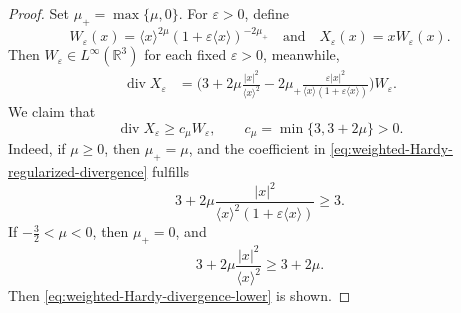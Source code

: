 \documentclass[11pt,twoside]{article}
\theoremstyle{plain}
\theoremstyle{definition}
\theoremstyle{assumption}
\numberwithin{equation}{section}
\begin{document}
	\begin{proof}
		Set
		$
		\mu_+=\max\{\mu,0\}.
		$
		For \(\varepsilon>0\), define
		\begin{equation*}
			W_\varepsilon(x)
			=
			\langle x\rangle^{2\mu}
			\left(
			1+\varepsilon\langle x\rangle
			\right)^{-2\mu_+}
		\quad\text{and} \quad
		X_\varepsilon(x)
			=xW_\varepsilon(x).
		\end{equation*}
		Then \(W_\varepsilon\in L^\infty(\mathbb R^3)\) for each fixed
		\(\varepsilon>0\), meanwhile,
		\begin{equation}
			\label{eq:weighted-Hardy-regularized-divergence}
			\begin{aligned}
				\operatorname{div}X_\varepsilon
				&=\big(3+2\mu\frac{|x|^2}{\langle x\rangle^2}
				-2\mu_+\frac{\varepsilon |x|^2}
				{\langle x\rangle(1+\varepsilon\langle x\rangle)}
				\big)W_\varepsilon.
			\end{aligned}
		\end{equation}
		We claim that
		\begin{equation}
			\label{eq:weighted-Hardy-divergence-lower}
			\operatorname{div}X_\varepsilon
			\ge
			c_\mu W_\varepsilon,
			\qquad
			c_\mu=\min\{3,3+2\mu\}>0.
		\end{equation}
		Indeed, if \(\mu\ge0\), then \(\mu_+=\mu\), and the coefficient in
		\eqref{eq:weighted-Hardy-regularized-divergence} fulfills
		\[
		3
		+
		2\mu
		\frac{|x|^2}
		{\langle x\rangle^2(1+\varepsilon\langle x\rangle)}
		\ge 3.
		\]
		If \(-\frac32<\mu<0\), then \(\mu_+=0\), and
		\[
		3
		+
		2\mu
		\frac{|x|^2}{\langle x\rangle^2}
		\ge
		3+2\mu.
		\]
		Then \eqref{eq:weighted-Hardy-divergence-lower} is shown.
		

\end{proof}
\end{document}
